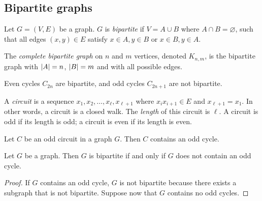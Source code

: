 \subsection{Bipartite graphs}
\begin{definition}
	Let \( G = (V, E) \) be a graph.
	\( G \) is \emph{bipartite} if \( V = A \cup B \) where \( A \cap B = \varnothing \), such that all edges \( (x,y) \in E \) satisfy \( x \in A, y \in B \) or \( x \in B, y \in A \).

	The \emph{complete bipartite graph} on \( n \) and \( m \) vertices, denoted \( K_{n,m} \), is the bipartite graph with \( \abs{A} = n \), \( \abs{B} = m \) and with all possible edges.
\end{definition}
\begin{remark}
	Even cycles \( C_{2n} \) are bipartite, and odd cycles \( C_{2n+1} \) are not bipartite.
\end{remark}
\begin{definition}
	A \emph{circuit} is a sequence \( x_1, x_2, \dots, x_\ell, x_{\ell + 1} \) where \( x_i x_{i+1} \in E \) and \( x_{\ell + 1} = x_1 \).
	In other words, a circuit is a closed walk.
	The \emph{length} of this circuit is \( \ell \).
	A circuit is odd if its length is odd; a circuit is even if its length is even.
\end{definition}
\begin{proposition}
	Let \( C \) be an odd circuit in a graph \( G \).
	Then \( C \) contains an odd cycle.
\end{proposition}
\begin{theorem}
	Let \( G \) be a graph.
	Then \( G \) is bipartite if and only if \( G \) does not contain an odd cycle.
\end{theorem}
\begin{proof}
	If \( G \) contains an odd cycle, \( G \) is not bipartite because there exists a subgraph that is not bipartite.
	Suppose now that \( G \) contains no odd cycles.
\end{proof}
